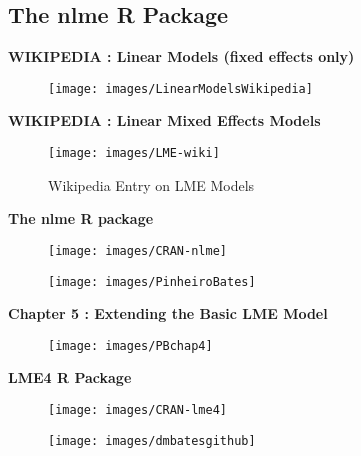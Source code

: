 \documentclass[compress]{beamer}        %
\begin{document}
	\subsection{The nlme R Package}
\begin{frame}
\noindent \textbf{WIKIPEDIA :  Linear Models (fixed effects only)}
	\begin{figure}
		
\centering
\texttt{[image: images/LinearModelsWikipedia]}
\end{figure}

\end{frame}	
					\begin{frame}
\noindent \textbf{WIKIPEDIA :  Linear Mixed Effects Models}
						\begin{figure}
\centering
\texttt{[image: images/LME-wiki]}
\caption{Wikipedia Entry on LME Models}
\end{figure}

					\end{frame}
				\begin{frame}
					\noindent \textbf{The nlme R package}
					\begin{figure}
						\centering
						\texttt{[image: images/CRAN-nlme]}
						
					\end{figure}
					
				\end{frame}
				\begin{frame}
					\begin{figure}
						\centering
						\texttt{[image: images/PinheiroBates]}
						
					\end{figure}
				\end{frame}
				\begin{frame}
					\noindent \textbf{Chapter 5 :  Extending the Basic LME Model}
					\begin{figure}
						\centering
						\texttt{[image: images/PBchap4]}
					\end{figure}
					
				\end{frame}
\begin{frame}
\noindent \textbf{LME4 R Package}
\begin{figure}
\centering
\texttt{[image: images/CRAN-lme4]}
\end{figure}
\end{frame}
\begin{frame}
	\begin{figure}
\centering
\texttt{[image: images/dmbatesgithub]}

\end{figure}

\end{frame}	
\end{document}
